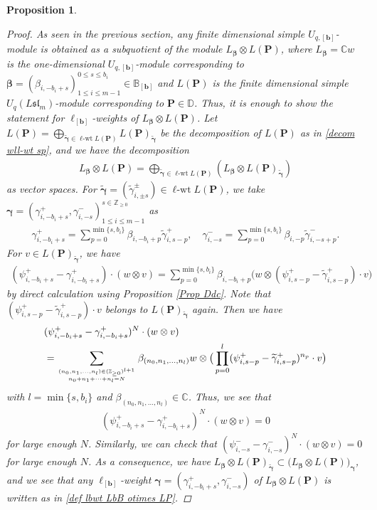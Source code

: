 \documentclass[12pt]{amsart}
\newtheorem{prop}[thm]{Proposition}
\numberwithin{equation}{thm}
\newcommand\BB{\mathbb B}
\newcommand\CC{\mathbb C}
\newcommand\DD{\mathbb D}
\newcommand\ZZ{\mathbb Z}
\newcommand\bP{\mathbf P}
\newcommand\bb{\mathbf b}
\renewcommand\b{\beta}   %
\newcommand\g{\gamma}
\newcommand\Bb{\boldsymbol\beta}
\newcommand\Bg{\boldsymbol\gamma}
\newcommand\wt{\widetilde}
\newcommand{\lwt}{\operatorname{\ell-wt}}
\newcommand\Fsl{\mathfrak{sl}}
\newcounter{ni}
\newcounter{go}
\begin{document}
\begin{prop}
\begin{proof}
As seen in the previous section, 
any finite dimensional simple $U_{q,[\bb]}$-module is obtained as a subquotient of the module 
$L_{\Bb} \otimes L(\bP)$, 
where $L_{\Bb} = \CC w$ is the one-dimensional $U_{q,[\bb]}$-module corresponding to 
$\Bb =(\b_{i, - b_i +s})^{ 0 \leq s \leq b_i}_{1 \leq i \leq m-1} \in \BB_{[\bb]}$ 
and  $L(\bP)$ is the finite dimensional simple $U_q (L\Fsl_m)$-module corresponding to $\bP \in \DD$. 
Thus, it is enough to show the statement for $\ell_{[\bb]}$-weights of $L_{\Bb} \otimes L (\bP)$.  
Let 
$L(\bP) = \bigoplus_{ \wt{\Bg}  \in \lwt L(\bP)} L(\bP)_{\wt{\Bg}} $ 
be the decomposition of $ L(\bP)$ as in \eqref{decom wll-wt sp}, 
and we have the decomposition 
\begin{align*}
L_{\Bb} \otimes L(\bP) = \bigoplus_{\wt{\Bg} \in \lwt L(\bP)} ( L_{\Bb} \otimes L(\bP)_{\wt{\Bg}})
\end{align*}
as vector spaces. 
For $\wt{\Bg} = (\wt{\g}_{i, \pm s}^{\pm}) \in \lwt L(\bP)$, 
we take $\Bg = (\g_{i, - b_i +s}^+, \g_{i, -s}^-)^{s \in \ZZ_{\geq 0}}_{1 \leq i \leq m-1}$ as 
\begin{align}
\label{def lbwt LbB otimes LP}
\g_{i, - b_i +s}^+ = \sum_{p=0}^{\min \{ s, b_i \}} \b_{i, - b_i +p} \wt{\g}_{i, s -p}^+, 
\quad 
\g_{i, -s}^- = \sum_{p=0}^{\min \{ s, b_i\}} \b_{i, - p} \wt{\g}_{i, - s+p}^-. 
\end{align}
For $v \in L(\bP)_{\wt{\Bg}}$, we have 
\begin{align*}
( \psi_{i, - b_i +s}^+ - \g_{i, - b_i+s}^+ ) \cdot (w \otimes v) 
= \sum_{p=0}^{\min \{s, b_i\}} \b_{i,- b_i +p} \big( w \otimes (\psi_{i, s-p}^+ - \wt{\g}_{i, s -p}^+) \cdot v \big)
\end{align*} 
by direct calculation using Proposition \ref{Prop Ddc}. 
Note that $(\psi_{i, s-p}^+ - \wt{\g}_{i, s-p}^+) \cdot v $  belongs to $L(\bP)_{\wt{\Bg}}$ again. 
Then we have 
\begin{align*}
&(\psi_{i, - b_i+s}^+ - \g_{i, - b_i +s}^+ )^N \cdot (w \otimes v) 
\\
&= \sum_{(n_0, n_1,\dots, n_l) \in (\ZZ_{\geq 0})^{l+1} \atop n_0 + n_1 + \dots + n_l =N} 
	\b_{(n_0, n_1, \dots, n_l)} w \otimes \big( \prod_{p=0}^l (\psi_{i, s- p}^+ - \wt{\g}_{i, s-p}^+)^{n_p} \cdot v \big) 
\end{align*}
with $l = \min\{s, b_i\}$ and  $\b_{(n_0, n_1, \dots, n_l)} \in \CC$. 
Thus, we see that 
\begin{align*}
(\psi_{i, - b_i+s}^+ - \g_{i, - b_i+s}^+)^N \cdot (w \otimes v)=0
\end{align*} 
for large enough  $N$. 
Similarly, we can check that $(\psi_{i, -s}^- - \g_{i, -s}^-)^N \cdot (w \otimes v) =0$ for large enough  $N$. 
As a consequence, we have 
$L_{\Bb} \otimes L(\bP)_{\wt{\Bg}} \subset \big( L_{\Bb} \otimes L(\bP) \big)_{\Bg}$, 
and we see that 
any $\ell_{[\bb]}$-weight $\Bg = (\g_{i, - b_i +s}^+, \g_{i, -s}^-)$ 
of $L_{\Bb} \otimes L(\bP)$ 
is written as in \eqref{def lbwt LbB otimes LP}. 


\end{proof}
\end{prop}
\end{document}
